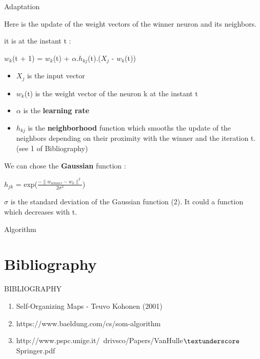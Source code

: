 \documentclass{beamer}
\begin{document}
	\begin{frame}{Adaptation}

Here is the update of the weight vectors of the winner neuron and its neighbors.

it is at the instant t : 

		\begin{center}

			$w_k$(t + 1) = $w_k$(t) + $\alpha$.$h_{kj}$(t).($X_j$ - $w_k$(t))	
		\end{center}

		\begin{itemize}
	
			\item $X_j$ is the input vector
			\item $w_k$(t) is the weight vector of the neuron k at the instant t
			\item $\alpha$ is the \textbf{learning rate}
			\item $h_{kj}$ is the \textbf{neighborhood} function which smooths the update of the neighbors depending on their proximity with the winner and the iteration t. (see 1 of Bibliography)
		\end{itemize}
	
We can chose the \textbf{Gaussian} function :

			\begin{center}
		
				$h_{jk}$ = exp($\frac{-\|w_{winner} - w_k\|^2}{2\sigma^2}$)
			\end{center}
		
$\sigma$ is the standard deviation of the Gaussian function (2). It could a function which decreases with t.
	\end{frame}


	\begin{frame}{Algorithm}
			
		
	\end{frame}
	


\section{Bibliography}
	
	\begin{frame}
	
		\begin{center}

			\Huge BIBLIOGRAPHY
		\end{center}
	\end{frame}


	\begin{frame}
	
		\begin{enumerate}
			
			\item Self-Organizing Maps - Teuvo Kohonen (2001)
			\item https://www.baeldung.com/cs/som-algorithm
			\item http://www.pspc.unige.it/~drivsco/Papers/VanHulle$\textunderscore$Springer.pdf
		\end{enumerate}
	\end{frame}
\end{document}
